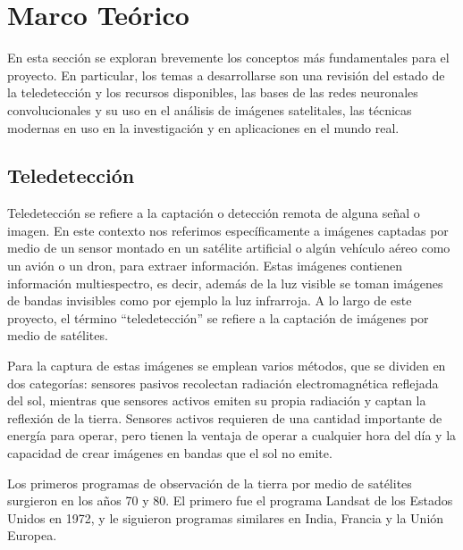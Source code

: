 \section{Marco Teórico}

En esta sección se exploran brevemente los conceptos más fundamentales para el proyecto. En particular, los temas a desarrollarse son una revisión del estado de la teledetección y los recursos disponibles, las bases de las redes neuronales convolucionales y su uso en el análisis de imágenes satelitales, las técnicas modernas en uso en la investigación y en aplicaciones en el mundo real.

\subsection{Teledetección}

Teledetección se refiere a la captación o detección remota de alguna señal o imagen. En este contexto nos referimos específicamente a imágenes captadas por medio de un sensor montado en un satélite artificial o algún vehículo aéreo como un avión o un dron, para extraer información. Estas imágenes contienen información multiespectro, es decir, además de la luz visible se toman imágenes de bandas invisibles como por ejemplo la luz infrarroja. \autocite{globalforestlink-how-sat-imaging-work} A lo largo de este proyecto, el término \enquote{teledetección} se refiere a la captación de imágenes por medio de satélites.

Para la captura de estas imágenes se emplean varios métodos, que se dividen en dos categorías: sensores pasivos recolectan radiación electromagnética reflejada del sol, mientras que sensores activos emiten su propia radiación y captan la reflexión de la tierra. Sensores activos requieren de una cantidad importante de energía para operar, pero tienen la ventaja de operar a cualquier hora del día y la capacidad de crear imágenes en bandas que el sol no emite. \autocite{globalforestlink-how-sat-imaging-work}

Los primeros programas de observación de la tierra por medio de satélites surgieron en los años 70 y 80. El primero fue el programa Landsat de los Estados Unidos en 1972, y le siguieron programas similares en India, Francia y la Unión Europea. \autocite{esa-space-year-2007}

